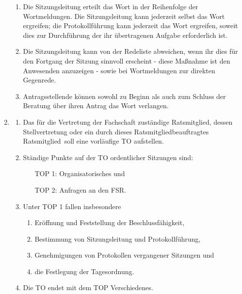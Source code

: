 \documentclass[a4paper, 12pt, ngerman]{article}
\newcommand{\rat}{FSR}
\newcommand{\mitglied}{Ratsmitglied}
\begin{document}
\begin{enumerate}[leftmargin=0cm]
	\begin{enumerate}[leftmargin=0cm]
		\item Die Sitzungsleitung erteilt das Wort in der Reihenfolge der Wortmeldungen. Die Sitzungsleitung kann
		jederzeit selbst das Wort ergreifen; die Protokollführung kann jederzeit das Wort ergreifen, soweit dies zur Durchführung der ihr übertragenen Aufgabe erforderlich ist.
		\item Die Sitzungsleitung kann von der Redeliste abweichen, wenn
		ihr dies für den Fortgang der Sitzung sinnvoll erscheint
		- diese Maßnahme ist den Anwesenden anzuzeigen - sowie bei
		Wortmeldungen zur direkten Gegenrede.
		\item Antragsstellende können sowohl zu Beginn als auch zum Schluss der Beratung über ihren
		Antrag das Wort verlangen.
	\end{enumerate}
	
	\item {} \label{tagesordnung}
	
	\begin{enumerate}[leftmargin=0cm]
		\item Das für die Vertretung der Fachschaft zuständige Ratsmitglied, dessen Stellvertretung oder ein durch dieses \mitglied beauftragtes \mitglied~soll eine vorläufige TO aufstellen.
		\item Ständige Punkte auf der TO ordentlicher Sitzungen sind:
		\begin{enumerate}[leftmargin=1.4cm]
			\item[TOP 1:] Organisatorisches und
			\item[TOP 2:] Anfragen an den \rat.
		\end{enumerate}
		\item Unter TOP 1 fallen insbesondere
		\begin{enumerate}[leftmargin=0.5cm]
			\item Eröffnung und Feststellung der Beschlussfähigkeit,
			\item Bestimmung von Sitzungsleitung und Protokollführung,
			\item Genehmigungen von Protokollen vergangener Sitzungen und
			\item die Festlegung der Tagesordnung.
		\end{enumerate}
		\item Die TO endet mit dem TOP Verschiedenes.
	\end{enumerate}
	
	

\end{enumerate}
\end{document}
